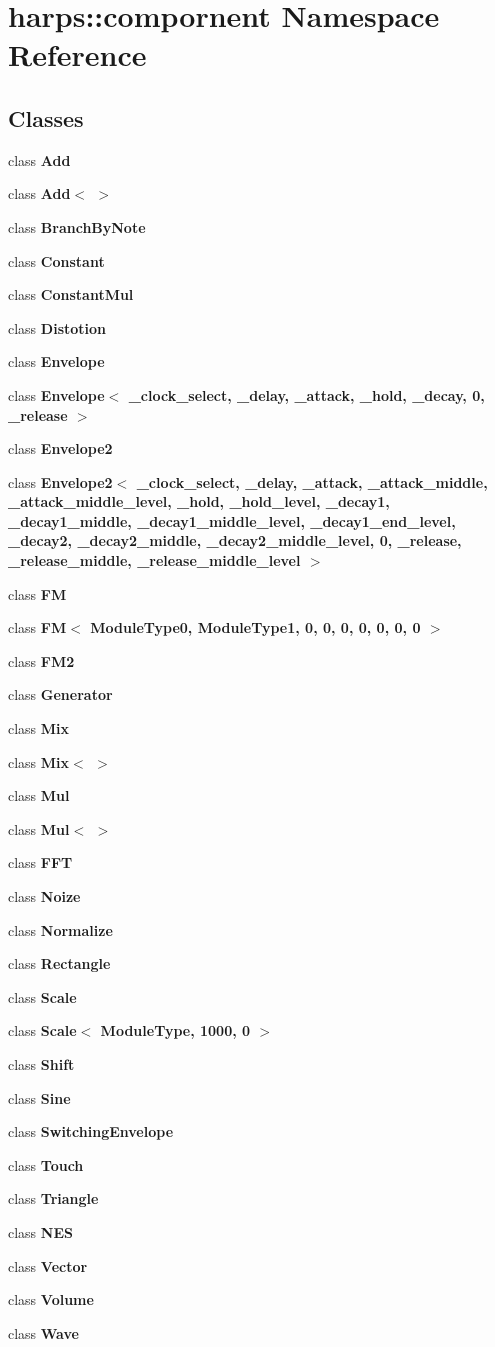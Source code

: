 \section{harps::compornent Namespace Reference}
\label{namespaceharps_1_1compornent}


\subsection*{Classes}
\begin{CompactItemize}
\item 
class {\bf Add}
\item 
class {\bf Add$<$  $>$}
\item 
class {\bf BranchByNote}
\item 
class {\bf Constant}
\item 
class {\bf ConstantMul}
\item 
class {\bf Distotion}
\item 
class {\bf Envelope}
\item 
class {\bf Envelope$<$ \_\-clock\_\-select, \_\-delay, \_\-attack, \_\-hold, \_\-decay, 0, \_\-release $>$}
\item 
class {\bf Envelope2}
\item 
class {\bf Envelope2$<$ \_\-clock\_\-select, \_\-delay, \_\-attack, \_\-attack\_\-middle, \_\-attack\_\-middle\_\-level, \_\-hold, \_\-hold\_\-level, \_\-decay1, \_\-decay1\_\-middle, \_\-decay1\_\-middle\_\-level, \_\-decay1\_\-end\_\-level, \_\-decay2, \_\-decay2\_\-middle, \_\-decay2\_\-middle\_\-level, 0, \_\-release, \_\-release\_\-middle, \_\-release\_\-middle\_\-level $>$}
\item 
class {\bf FM}
\item 
class {\bf FM$<$ ModuleType0, ModuleType1, 0, 0, 0, 0, 0, 0, 0 $>$}
\item 
class {\bf FM2}
\item 
class {\bf Generator}
\item 
class {\bf Mix}
\item 
class {\bf Mix$<$  $>$}
\item 
class {\bf Mul}
\item 
class {\bf Mul$<$  $>$}
\item 
class {\bf FFT}
\item 
class {\bf Noize}
\item 
class {\bf Normalize}
\item 
class {\bf Rectangle}
\item 
class {\bf Scale}
\item 
class {\bf Scale$<$ ModuleType, 1000, 0 $>$}
\item 
class {\bf Shift}
\item 
class {\bf Sine}
\item 
class {\bf SwitchingEnvelope}
\item 
class {\bf Touch}
\item 
class {\bf Triangle}
\item 
class {\bf NES}
\item 
class \textbf{Vector}
\item 
class {\bf Volume}
\item 
class {\bf Wave}
\end{CompactItemize}
